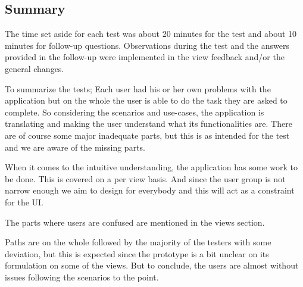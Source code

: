 \subsection{Summary}
The time set aside for each test was about 20 minutes for the test and about 10 minutes for follow-up questions. Observations during the test and the answers provided in the follow-up were implemented in the view feedback and/or the general changes.

To summarize the tests; Each user had his or her own problems with the application but on the whole the user is able to do the task they are asked to complete. So considering the scenarios and use-cases, the application is translating and making the user understand what its functionalities are. There are of course some major inadequate parts, but this is as intended for the test and we are aware of the missing parts.

When it comes to the intuitive understanding, the application has some work to be done. This is covered on a per view basis. And since the user group is not narrow enough we aim to design for everybody and this will act as a constraint for the UI. 

The parts where users are confused are mentioned in the views section.

Paths are on the whole followed by the majority of the testers with some deviation, but this is expected since the prototype is a bit unclear on its formulation on some of the views. But to conclude, the users are almost without issues following the scenarios to the point.

\cleardoublepage